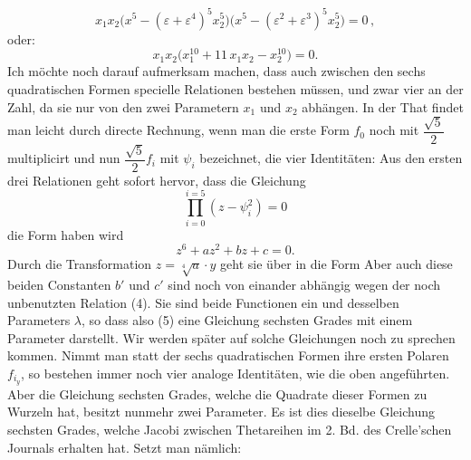 \[
x_1x_2\big(x^5 - (\varepsilon+\varepsilon^4)^5 x_2^5\big)\big(x^5 - (\varepsilon^2+\varepsilon^3)^5 x_2^5\big) = 0\,, %
\]
oder:
\[
x_1x_2\big(x_1^{10} + 11\,x_1x_2 - x_2^{10}\big) = 0.
\]
Ich möchte noch darauf aufmerksam machen, dass auch zwischen den sechs quadratischen Formen specielle Relationen bestehen müssen, und zwar vier an der Zahl, da sie nur von den zwei Parametern $x_1$ und $x_2$ abhängen. In der That findet man leicht durch directe Rechnung, wenn man die erste Form $f_0$ noch mit $\dfrac{\sqrt5}{2}$ multiplicirt und nun $\dfrac{\sqrt5}{2}f_i$ mit $\psi_i$ bezeichnet, die vier Identitäten:
Aus den ersten drei Relationen geht sofort hervor, dass die Gleichung
\[
\prod_{i=0}^{i=5}(z-\psi_i^2) = 0
\]
die Form haben wird
\[
z^6 + az^2 + bz + c = 0.
\]
Durch die Transformation $z = \sqrt[4]{a}\cdot y$ geht sie über in die Form
Aber auch diese beiden Constanten $b'$ und $c'$ sind noch von einander abhängig wegen der noch unbenutzten Relation (4). Sie sind beide Functionen ein und desselben Parameters $\lambda$, so dass also (5) eine Gleichung sechsten Grades mit einem  Parameter darstellt. Wir werden später auf solche Gleichungen noch zu sprechen kommen. Nimmt man statt der sechs quadratischen Formen ihre ersten Polaren $f_{i_y}$, so bestehen immer noch vier analoge Identitäten, wie die oben angeführten. Aber die Gleichung sechsten Grades, welche die Quadrate dieser Formen zu Wurzeln hat, besitzt nunmehr zwei Parameter. Es ist dies dieselbe Gleichung sechsten Grades, welche Jacobi zwischen Thetareihen im 2. Bd. des Crelle'schen Journals erhalten hat. Setzt man nämlich:


